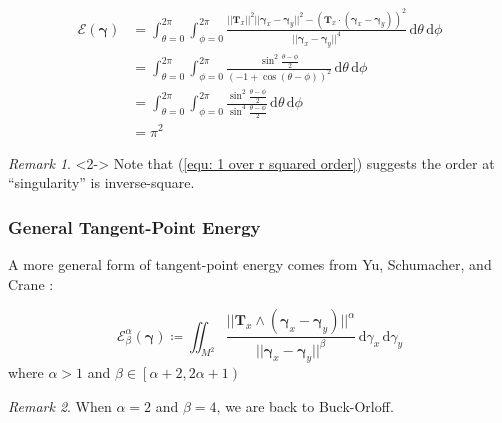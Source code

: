 \documentclass{beamer}
\theoremstyle{remark}
\newtheorem{remark}{Remark}
\newcommand{\gammabf}{\boldsymbol{\gamma}}
\newcommand{\intd}{\, \text{d}}
\newcommand{\norm}[1]{\lvert \lvert #1 \rvert \rvert}
\begin{document}
\begin{frame}
    \begin{example}[Cont.]
        \begin{align}
            \mathcal{E} \left( \gammabf \right) &= \int_{\theta=0}^{2 \pi} \int_{\phi=0}^{2 \pi}
            \frac{\norm{\mathbf{T}_x}^2 \norm{\gammabf_x - \gammabf_y}^2 - \left( \mathbf{T}_x \cdot \left( \gammabf_x -\gammabf_y \right) \right)^2}{\norm{\gammabf_x - \gammabf_y}^4} \intd \theta \intd \phi \\
            &= \int_{\theta=0}^{2 \pi} \int_{\phi=0}^{2 \pi}
            \frac{\sin^2 \frac{\theta - \phi}{2}}{\left( -1 + \cos \left( \theta - \phi \right) \right)^2} \intd \theta \intd \phi \\
            &= \int_{\theta=0}^{2 \pi} \int_{\phi=0}^{2 \pi}
            \frac{\sin^2 \frac{\theta - \phi}{2}}{\sin^4 \frac{\theta - \phi}{2}} \intd \theta \intd \phi
            \label{equ: 1 over r squared order}
            \\
            &= \pi^2
        \end{align}
    \end{example}
    \begin{remark}<2->
        Note that (\ref{equ: 1 over r squared order}) suggests the order at ``singularity'' is inverse-square.
    \end{remark}
\end{frame}

\begin{frame}
    \frametitle{General Tangent-Point Energy}
    A more general form of tangent-point energy comes from Yu, Schumacher, and Crane \cite{YSC2021}:
    \begin{definition}
        \begin{equation*}
            \mathcal{E}_{\beta}^{\alpha} \left( \gammabf \right) \coloneqq
            \iint_{M^2} \frac{\norm{\mathbf{T}_x \wedge \left( \gammabf_x - \gammabf_y \right)}^{\alpha}}{\norm{\gammabf_x - \gammabf_y}^{\beta}}
            \intd \gamma_x \intd \gamma_y
        \end{equation*}
        where $\alpha > 1$ and $\beta \in \left[ \alpha+2, 2\alpha+1 \right)$
    \end{definition}
    \begin{remark}
        When $\alpha = 2$ and $\beta = 4$, we are back to Buck-Orloff.
    \end{remark}
\end{frame}
\end{document}
